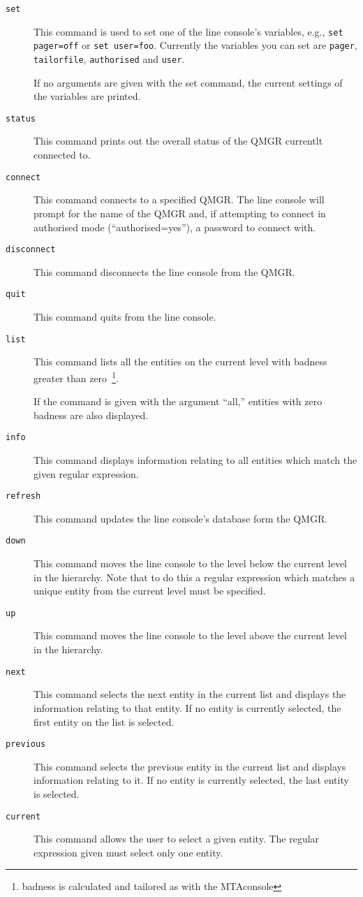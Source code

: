 \begin{description}
\item[\verb+set+] This command is used to set one of the line
console's variables, e.g., \verb+set pager=off+ or \verb+set user=foo+.
Currently the variables you can set are \verb+pager+, \verb+tailorfile+,
\verb+authorised+ and \verb+user+.

If no arguments are given with the set command, the current
settings of the variables are printed.

\item[\verb+status+] This command prints out the overall status of the
QMGR currentlt connected to.

\item[\verb+connect+] This command connects to a specified QMGR.
The line console will prompt for the name of the QMGR and, if
attempting to connect in authorised mode 
(``authorised=yes''), a password to connect with.

\item[\verb+disconnect+] This command disconnects the line console
from the QMGR.

\item[\verb+quit+] This command quits from the line console.

\item[\verb+list+] This command lists all the entities on the current
level with badness greater than zero~\footnote{badness is calculated and tailored as with the
MTAconsole}. 

If the command is given with the argument ``all,''
entities with zero badness are also displayed.

\item[\verb+info+] This command displays information relating to all
entities which match the given regular expression.

\item[\verb+refresh+] This command updates the line console's database
form the QMGR.

\item[\verb+down+] This command moves the line console to the level
below the current level in the hierarchy. Note that to do this a
regular expression which matches a unique entity from the current
level must be specified.

\item[\verb+up+] This command moves the line console to the level above
the current level in the hierarchy.

\item[\verb+next+] This command selects the next entity in the current
list and displays the information relating to that entity.
If no entity is currently selected, the first entity on the list is
selected.
\item[\verb+previous+] This command selects the previous entity in the
current list and displays information relating to it.
If no entity is currently selected, the last entity is selected.
\item[\verb+current+] This command allows the user to select a given
entity. The regular expression given must select only one entity.
\end{description}

